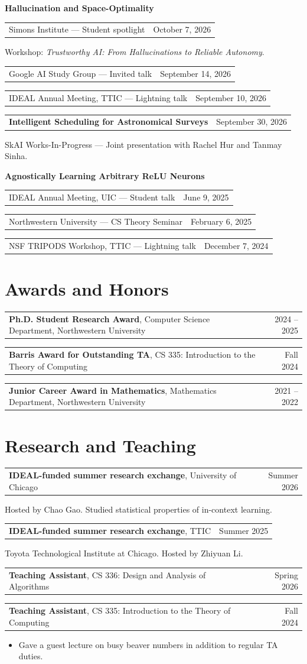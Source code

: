 \documentclass[11pt,letterpaper]{article}
\makeatletter
\newcommand{\datedline}[2]{%
  \begin{tabularx}{\textwidth}{@{}X@{\hspace{0.8em}}r@{}}
    #1 & #2
  \end{tabularx}\par
}
\newenvironment{cvitems}{%
  \begin{itemize}[leftmargin=1.2em,itemsep=0.03em,topsep=0.1em,parsep=0pt,partopsep=0pt]
}{%
  \end{itemize}
}
\makeatother
\begin{document}
\textbf{Hallucination and Space-Optimality}\par
\datedline{Simons Institute --- Student spotlight}{October 7, 2026}
Workshop: \emph{Trustworthy AI: From Hallucinations to Reliable Autonomy}.\par
\datedline{Google AI Study Group --- Invited talk}{September 14, 2026}
\datedline{IDEAL Annual Meeting, TTIC --- Lightning talk}{September 10, 2026}
\smallskip

\datedline{\textbf{Intelligent Scheduling for Astronomical Surveys}}{September 30, 2026}
SkAI Works-In-Progress --- Joint presentation with Rachel Hur and Tanmay Sinha.
\smallskip

\textbf{Agnostically Learning Arbitrary ReLU Neurons}\par
\datedline{IDEAL Annual Meeting, UIC --- Student talk}{June 9, 2025}
\datedline{Northwestern University --- CS Theory Seminar}{February 6, 2025}
\datedline{NSF TRIPODS Workshop, TTIC --- Lightning talk}{December 7, 2024}

\section{Awards and Honors}

\datedline{\textbf{Ph.D. Student Research Award}, Computer Science Department, Northwestern University}{2024 -- 2025}
\datedline{\textbf{Barris Award for Outstanding TA}, CS 335: Introduction to the Theory of Computing}{Fall 2024}
\datedline{\textbf{Junior Career Award in Mathematics}, Mathematics Department, Northwestern University}{2021 -- 2022}

\section{Research and Teaching}

\datedline{\textbf{IDEAL-funded summer research exchange}, University of Chicago}{Summer 2026}
Hosted by Chao Gao. Studied statistical properties of in-context learning.

\datedline{\textbf{IDEAL-funded summer research exchange}, TTIC}{Summer 2025}
Toyota Technological Institute at Chicago. Hosted by Zhiyuan Li.

\datedline{\textbf{Teaching Assistant}, CS 336: Design and Analysis of Algorithms}{Spring 2026}

\datedline{\textbf{Teaching Assistant}, CS 335: Introduction to the Theory of Computing}{Fall 2024}
\begin{cvitems}
  \item Gave a guest lecture on busy beaver numbers in addition to regular TA duties.
\end{cvitems}
\end{document}

